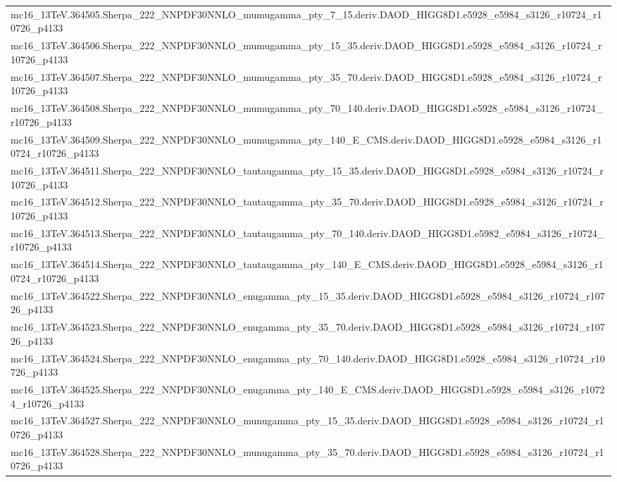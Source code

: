 \begin{adjustwidth}{-3em}{-3em}
\begin{longtable}{l}
mc16\_13TeV.364505.Sherpa\_222\_NNPDF30NNLO\_mumugamma\_pty\_7\_15.deriv.DAOD\_HIGG8D1.e5928\_e5984\_s3126\_r10724\_r10726\_p4133 \\
mc16\_13TeV.364506.Sherpa\_222\_NNPDF30NNLO\_mumugamma\_pty\_15\_35.deriv.DAOD\_HIGG8D1.e5928\_e5984\_s3126\_r10724\_r10726\_p4133 \\
mc16\_13TeV.364507.Sherpa\_222\_NNPDF30NNLO\_mumugamma\_pty\_35\_70.deriv.DAOD\_HIGG8D1.e5928\_e5984\_s3126\_r10724\_r10726\_p4133 \\
mc16\_13TeV.364508.Sherpa\_222\_NNPDF30NNLO\_mumugamma\_pty\_70\_140.deriv.DAOD\_HIGG8D1.e5928\_e5984\_s3126\_r10724\_r10726\_p4133 \\
mc16\_13TeV.364509.Sherpa\_222\_NNPDF30NNLO\_mumugamma\_pty\_140\_E\_CMS.deriv.DAOD\_HIGG8D1.e5928\_e5984\_s3126\_r10724\_r10726\_p4133 \\
mc16\_13TeV.364511.Sherpa\_222\_NNPDF30NNLO\_tautaugamma\_pty\_15\_35.deriv.DAOD\_HIGG8D1.e5928\_e5984\_s3126\_r10724\_r10726\_p4133 \\
mc16\_13TeV.364512.Sherpa\_222\_NNPDF30NNLO\_tautaugamma\_pty\_35\_70.deriv.DAOD\_HIGG8D1.e5928\_e5984\_s3126\_r10724\_r10726\_p4133 \\
mc16\_13TeV.364513.Sherpa\_222\_NNPDF30NNLO\_tautaugamma\_pty\_70\_140.deriv.DAOD\_HIGG8D1.e5982\_e5984\_s3126\_r10724\_r10726\_p4133 \\
mc16\_13TeV.364514.Sherpa\_222\_NNPDF30NNLO\_tautaugamma\_pty\_140\_E\_CMS.deriv.DAOD\_HIGG8D1.e5928\_e5984\_s3126\_r10724\_r10726\_p4133 \\
mc16\_13TeV.364522.Sherpa\_222\_NNPDF30NNLO\_enugamma\_pty\_15\_35.deriv.DAOD\_HIGG8D1.e5928\_e5984\_s3126\_r10724\_r10726\_p4133 \\
mc16\_13TeV.364523.Sherpa\_222\_NNPDF30NNLO\_enugamma\_pty\_35\_70.deriv.DAOD\_HIGG8D1.e5928\_e5984\_s3126\_r10724\_r10726\_p4133 \\
mc16\_13TeV.364524.Sherpa\_222\_NNPDF30NNLO\_enugamma\_pty\_70\_140.deriv.DAOD\_HIGG8D1.e5928\_e5984\_s3126\_r10724\_r10726\_p4133 \\
mc16\_13TeV.364525.Sherpa\_222\_NNPDF30NNLO\_enugamma\_pty\_140\_E\_CMS.deriv.DAOD\_HIGG8D1.e5928\_e5984\_s3126\_r10724\_r10726\_p4133 \\
mc16\_13TeV.364527.Sherpa\_222\_NNPDF30NNLO\_munugamma\_pty\_15\_35.deriv.DAOD\_HIGG8D1.e5928\_e5984\_s3126\_r10724\_r10726\_p4133 \\
mc16\_13TeV.364528.Sherpa\_222\_NNPDF30NNLO\_munugamma\_pty\_35\_70.deriv.DAOD\_HIGG8D1.e5928\_e5984\_s3126\_r10724\_r10726\_p4133 \\

\end{longtable}
\end{adjustwidth}
